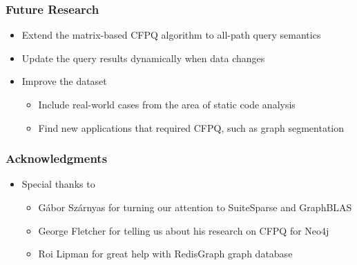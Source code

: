 \documentclass[xcolor=table]{beamer}
\begin{document}
\begin{frame}[fragile] \frametitle{Future Research}
  \begin{itemize}
  	\item Extend the matrix-based CFPQ algorithm to all-path
  	query semantics
  	\pause
  	\item Update the query results dynamically when data changes
  	\pause
    \item Improve the dataset
    \begin{itemize}
      \item Include real-world cases from
      the area of static code analysis
      \item Find new applications that required CFPQ, such as graph
      segmentation
    \end{itemize}
\end{itemize}
\end{frame}

\begin{frame}
\frametitle{Acknowledgments}
\begin{itemize}
	\item Special thanks to
	\begin{itemize}
		\item Gábor Szárnyas for turning our attention to SuiteSparse and GraphBLAS
		\item George Fletcher for telling us about his research on CFPQ for Neo4j
		\item Roi Lipman for great help with RedisGraph graph database
	\end{itemize}
\end{itemize}
\end{frame}
\end{document}
